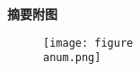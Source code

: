 \documentclass[heading=true,zihao=-4]{ctexart}
\begin{document}
\fi

\ifx\foothide\undefined
\else
	\fancyfoot{}
	\headtit{}
	\centerline{\textbf{\large{摘要附图}}}
\fi



\def\anum{1}


\begin{figure}[hb]
\centering
\texttt{[image: figure\\anum.png]}
\end{figure}


\ifx\allfiles\undefined
\end{document}
